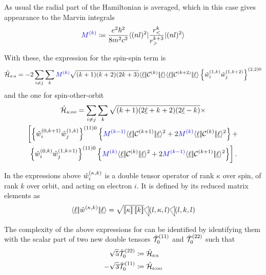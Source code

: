 \documentclass{article}
\begin{document}
As usual the radial part of the Hamiltonian is averaged, which in this case gives appearance to the Marvin integrals
\begin{equation} 
\textcolor{blue}{M^{(k)}} \coloneqq \frac{e^2\hbar^2}{8m^2c^2} \langle (nl)^2|\frac{r_<^k}{r_>^{k+3}}|(nl)^2\rangle
\end{equation}

With these, the expression for the spin-spin term is \cite{judd_intra-atomic_1968}
\begin{multline}
\hat{\mathcal{H}}_{s:s} = -2 \sum_{i\neq{j}}
    \sum_k \textcolor{blue}{M^{(k)}}
        \sqrt{(k+1)(k+2)(2k+3)} 
        \langle \underbar{$\ell$}|\!|\mathcal{C}^{(k)}|\!|\underbar{$\ell$}\rangle 
        \langle \underbar{$\ell$}|\!|\mathcal{C}^{(k+2)}|\!|\underbar{$\ell$}\rangle
        \left\{
            \hat{w}_{i}^{({1},{k})}
            \hat{w}_{j}^{({1},{k+2})}
        \right\}^{(2,2)0}
\end{multline}
and the one for spin-other-orbit 
\begin{multline}
    \ham_{s:oo} = \sum_{i\neq{j}} 
        \sum_k 
            \sqrt{(k+1)(2\lorb+k+2)(2\lorb-k)}  \times \\ 
    \left[ \left\{ \wdouble{i}{0}{k+1} \wdouble{j}{1}{k} \right\}^{(11)0} 
    \left\{ \Mk{k-1}
        \redbraopket{\lorb}
            {\Ck{k+1}}
            {\lorb}^2
        +
        2 \Mk{k} \redbraopket{\lorb}{\Ck{k}}{\lorb}^2
    \right\} + \right. \\
    \left.
        \left\{ \wdouble{i}{0}{k}\wdouble{j}{1}{k+1} \right\}^{(11)0} 
            \left\{ \Mk{k} 
                \redbraopket{\lorb}{\Ck{k}}{\lorb}^2
                + 2 \Mk{k-1}
                \redbraopket{\lorb}{\Ck{k+1}}{\lorb}^2
            \right\}
    \right].
\end{multline} 

In the expressions above $\hat{w}_{i}^{({\kappa},{k})}$ is a double tensor operator of rank $\kappa$ over spin, of rank $k$ over orbit, and acting on electron $i$. It is defined by its reduced matrix elements as
\begin{equation}
\redbraopket{\lorb}
    {\wdouble{}{\kappa}{k}}
    {\lorb}
    = \sqrt{\tpobraket{\kappa}
        \tpobraket{k}
    } \tricondition{l,\kappa,l}\tricondition{l,k,l}
\end{equation} 

The complexity of the above expressions for can be identified by identifying them with the scalar part of two new double tensors $\hat{\mathcal{T}}^{(11)}_{0}$ and $\hat{\mathcal{T}}^{(22)}_{0}$ such that
\begin{align}
\sqrt{5}\hat{\mathcal{T}}^{(22)}_{0} &\coloneqq \hat{\mathcal{H}}_{\text{s:s}} \\
-\sqrt{3}\hat{\mathcal{T}}^{(11)}_{0} &\coloneqq \hat{\mathcal{H}}_\text{s:oo}
\end{align}
\end{document}
